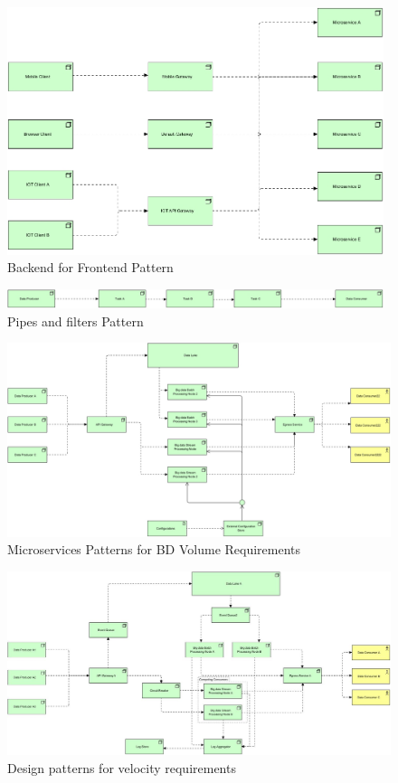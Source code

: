 \documentclass{bmcart}
\begin{document}
\begin{backmatter}
\begin{figure}[h]
  \includegraphics[width=11cm]{Media/Backend for Frontend.jpg}
  \caption{Backend for Frontend Pattern}
  \label{backend-for-fronted}
\end{figure}

\begin{figure}[h]
  \includegraphics[width=11cm]{Media/Pipes and Filters.jpg}
  \caption{Pipes and filters Pattern}
  \label{PipesAndFilters}
\end{figure}

\begin{figure}[h]
  \centering 
  \includegraphics[width=12cm]{Media/Vol-1 Requirement RA.jpg}
  \caption{Microservices Patterns for BD Volume Requirements}
  \label{fig:VolReq}
\end{figure}

\begin{figure}[h!]
    \includegraphics[width=12cm]{Media/Velocity Requirement.jpg}
    \caption{Design patterns for velocity requirements}
    \label{fig-vel-ra}
\end{figure}



\end{backmatter}
\end{document}
